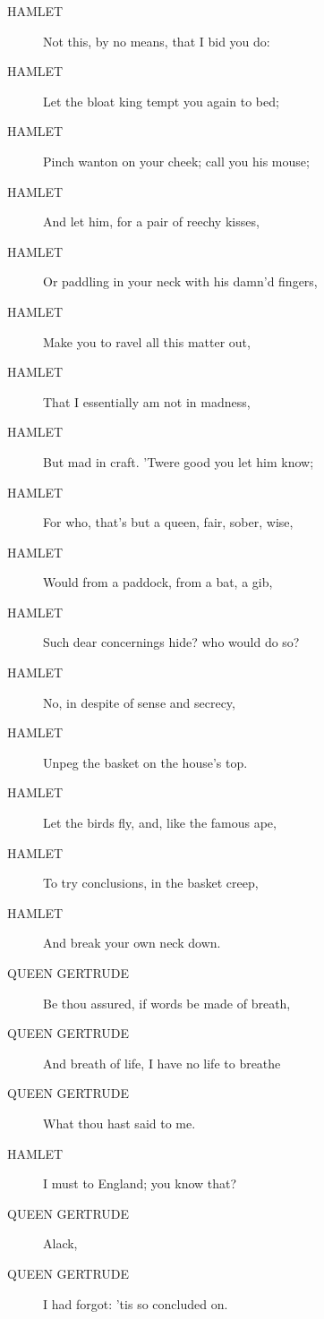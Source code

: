 \documentclass{article}
\begin{document}
\begin{description}
            
\item[HAMLET] Not this, by no means, that I bid you do:
\item[HAMLET] Let the bloat king tempt you again to bed;
\item[HAMLET] Pinch wanton on your cheek; call you his mouse;
\item[HAMLET] And let him, for a pair of reechy kisses,
\item[HAMLET] Or paddling in your neck with his damn'd fingers,
\item[HAMLET] Make you to ravel all this matter out,
\item[HAMLET] That I essentially am not in madness,
\item[HAMLET] But mad in craft. 'Twere good you let him know;
\item[HAMLET] For who, that's but a queen, fair, sober, wise,
\item[HAMLET] Would from a paddock, from a bat, a gib,
\item[HAMLET] Such dear concernings hide? who would do so?
\item[HAMLET] No, in despite of sense and secrecy,
\item[HAMLET] Unpeg the basket on the house's top.
\item[HAMLET] Let the birds fly, and, like the famous ape,
\item[HAMLET] To try conclusions, in the basket creep,
\item[HAMLET] And break your own neck down.
\end{description}
          
\begin{description}
            
\item[QUEEN GERTRUDE] Be thou assured, if words be made of breath,
\item[QUEEN GERTRUDE] And breath of life, I have no life to breathe
\item[QUEEN GERTRUDE] What thou hast said to me.
\end{description}
          
\begin{description}
            
\item[HAMLET] I must to England; you know that?
\end{description}
          
\begin{description}
            
\item[QUEEN GERTRUDE] Alack,
\item[QUEEN GERTRUDE] I had forgot: 'tis so concluded on.
\end{description}
          
\end{document}
